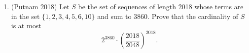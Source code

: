 \documentclass[11pt]{article}
\begin{document}
\begin{enumerate}
\item
(Putnam 2018) Let $S$ be the set of sequences of length 2018 whose terms are in the set $\{1, 2, 3, 4, 5, 6, 10\}$ and sum to 3860. Prove that the cardinality of $S$ is at most
\[2^{3860} \cdot \left(\frac{2018}{2048}\right)^{2018}.\]

\end{enumerate}
\end{document}
